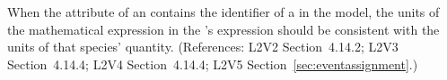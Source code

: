 When the  attribute of an \EventAssignment
contains the identifier of a \Species in the model, the
units of the mathematical expression in the
\EventAssignment's  expression should be
consistent with the units of that species' quantity.
(References: L2V2 Section~4.14.2; L2V3 Section~4.14.4; L2V4 Section~4.14.4; L2V5 Section~\ref{sec:eventassignment}.)

